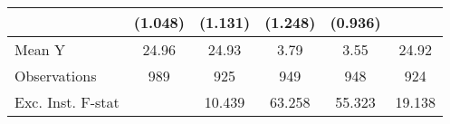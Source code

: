 {\begin{tabular}{l*{5}{c}}
            &     (1.048)         &     (1.131)         &     (1.248)         &     (0.936)         &                     \\
\midrule
Mean Y      &       24.96         &       24.93         &        3.79         &        3.55         &       24.92         \\
Observations&         989         &         925         &         949         &         948         &         924         \\
Exc. Inst. F-stat&                     &      10.439         &      63.258         &      55.323         &      19.138         \\
\bottomrule
\end{tabular}
}
